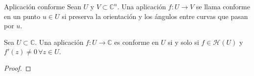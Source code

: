 \begin{definition}{Aplicación conforme}
    Sean $U$ y $V \subset \mathbb{C}^n$. Una aplicación $f: U \rightarrow V$ se llama conforme en un punto $u \in U$ si preserva la orientación y los ángulos entre curvas que pasan por $u$.
\end{definition}

\begin{prop}
    Sea $U \subset \mathbb{C}$. Una aplicación $f: U \rightarrow \mathbb{C}$ es conforme en $U$ si y solo si $f \in \mathcal{H}(U)$ y $f'(z) \not = 0 \, \forall z \in U$.
\end{prop}

\begin{proof}
    \begin{comment}
    $(\Leftarrow)$ Supongamos que $f(z)$ es una función holomorfa en $U$ tal que $f'(z) \not = 0$ para $z \in U$ y consideremos $f:z \rightarrow w=f(z)$. Sea $\gamma: [a,b] \rightarrow U$ una curva simple. Consideremos $\lambda = (f \circ  \gamma)(t)$. Por la regla de la cadena, $\lambda$ es continuamente diferenciable y como $f'(\gamma(t)) \not = 0$, tenemos
    \begin{equation}
        \label{cadena}
        \lambda'(t) = f'(\gamma(t))\gamma'(t).
    \end{equation}
    Por lo tanto, $\lambda$ es una curva simple en el plano $w$.

    Sean $\gamma_1, \gamma_2: [a,b] \rightarrow U$ curvas simples tales que $c=\gamma_1(a) = \gamma_2(a)$. Definimos el ángulo $\theta$ entre $\gamma_1$ y $\gamma_2$ en $c$ como el argumento de $\frac{\gamma_2'(a)}{\gamma_1'(a)}$. Como el argumento es aditivo para la multiplicación de funciones, tenemos que
    \begin{equation*}
    \begin{split}
        \arg \lambda_1'(a) = \arg f'(c) + \arg \gamma_1'(a)\\
        \arg \lambda_2'(a) = \arg f'(c) + \arg \gamma_2'(a)
    \end{split}
    \end{equation*}

    y entonces
    \begin{equation*}
        \arg  \frac{\lambda_2'(a)}{\lambda_1'(a)} = \arg \lambda_2'(a) - \arg \lambda_1'(a) = \arg \gamma_2'(a) - \arg \gamma_1'(a) = \arg  \frac{\gamma_2'(a)}{\gamma_1'(a)}.
    \end{equation*}

    Así, el ángulo entre las curvas $\lambda_1$ y $\lambda_2$ en $d = \lambda_1(a) = \lambda_2(a)$ es igual al ángulo $\theta$ entre las curvas $\gamma_1$ y $\gamma_2$ en $c$. \\ \par
    \end{comment}


\end{proof}
